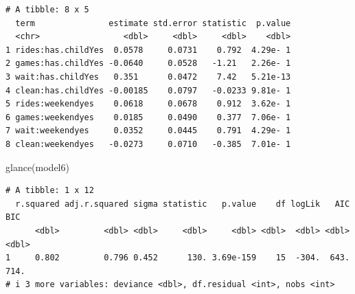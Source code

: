 \documentclass[
  ignorenonframetext,
]{beamer}
\newenvironment{Shaded}{\begin{snugshade}}{\end{snugshade}}
\newcommand{\FunctionTok}[1]{\textcolor[rgb]{0.28,0.35,0.67}{#1}}
\newcommand{\NormalTok}[1]{\textcolor[rgb]{0.00,0.23,0.31}{#1}}
\begin{document}
\begin{frame}[fragile]{}
\begin{verbatim}
# A tibble: 8 x 5
  term               estimate std.error statistic  p.value
  <chr>                 <dbl>     <dbl>     <dbl>    <dbl>
1 rides:has.childYes  0.0578     0.0731    0.792  4.29e- 1
2 games:has.childYes -0.0640     0.0528   -1.21   2.26e- 1
3 wait:has.childYes   0.351      0.0472    7.42   5.21e-13
4 clean:has.childYes -0.00185    0.0797   -0.0233 9.81e- 1
5 rides:weekendyes    0.0618     0.0678    0.912  3.62e- 1
6 games:weekendyes    0.0185     0.0490    0.377  7.06e- 1
7 wait:weekendyes     0.0352     0.0445    0.791  4.29e- 1
8 clean:weekendyes   -0.0273     0.0710   -0.385  7.01e- 1
\end{verbatim}

\begin{Shaded}
\begin{Highlighting}[]
\FunctionTok{glance}\NormalTok{(model6)}
\end{Highlighting}
\end{Shaded}

\begin{verbatim}
# A tibble: 1 x 12
  r.squared adj.r.squared sigma statistic   p.value    df logLik   AIC   BIC
      <dbl>         <dbl> <dbl>     <dbl>     <dbl> <dbl>  <dbl> <dbl> <dbl>
1     0.802         0.796 0.452      130. 3.69e-159    15  -304.  643.  714.
# i 3 more variables: deviance <dbl>, df.residual <int>, nobs <int>
\end{verbatim}
\end{frame}
\end{document}
